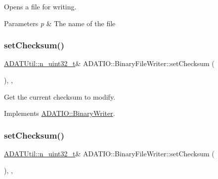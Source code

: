 Opens a file for writing. 
\begin{DoxyParams}{Parameters}
{\em p} & The name of the file \\
\hline
\end{DoxyParams}
\mbox{\label{classADATIO_1_1BinaryFileWriter_a0137ec5926d08e49ed7a63c6ef33e882}} 
\subsubsection{\texorpdfstring{setChecksum()}{setChecksum()}\hspace{0.1cm}{\footnotesize\ttfamily [1/2]}}
{\footnotesize\ttfamily \mbox{\hyperlink{namespaceADATUtil_ad945a8afa4db2d1f89b731964adae97e}{A\+D\+A\+T\+Util\+::n\+\_\+uint32\+\_\+t}}\& A\+D\+A\+T\+I\+O\+::\+Binary\+File\+Writer\+::set\+Checksum (\begin{DoxyParamCaption}{ }\end{DoxyParamCaption})\hspace{0.3cm}{\ttfamily [inline]}, {\ttfamily [protected]}, {\ttfamily [virtual]}}



Get the current checksum to modify. 



Implements \mbox{\hyperlink{classADATIO_1_1BinaryWriter_ae64230370824192d1f0dbcaa8e74017a}{A\+D\+A\+T\+I\+O\+::\+Binary\+Writer}}.

\mbox{\label{classADATIO_1_1BinaryFileWriter_a0137ec5926d08e49ed7a63c6ef33e882}} 
\subsubsection{\texorpdfstring{setChecksum()}{setChecksum()}\hspace{0.1cm}{\footnotesize\ttfamily [2/2]}}
{\footnotesize\ttfamily \mbox{\hyperlink{namespaceADATUtil_ad945a8afa4db2d1f89b731964adae97e}{A\+D\+A\+T\+Util\+::n\+\_\+uint32\+\_\+t}}\& A\+D\+A\+T\+I\+O\+::\+Binary\+File\+Writer\+::set\+Checksum (\begin{DoxyParamCaption}{ }\end{DoxyParamCaption})\hspace{0.3cm}{\ttfamily [inline]}, {\ttfamily [protected]}, {\ttfamily [virtual]}}



